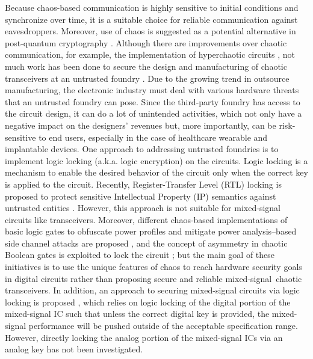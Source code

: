 Because chaos-based communication \cite{zhong1985experimental, hedayatipour2021comprehensive} is highly sensitive to initial conditions and synchronize over time, it is a suitable choice for reliable communication \cite{duan2022fully} against eavesdroppers. Moreover, use of chaos is suggested as a potential alternative in post-quantum cryptography \cite{onuki2022secret}. Although there are improvements over chaotic communication, for example, the implementation of hyperchaotic circuits \cite{zhang2022hyperchaotic}, not much work has been done to secure the design and manufacturing of chaotic transceivers at an untrusted foundry \cite{rezaei2019hybrid}. Due to the growing trend in outsource manufacturing, the electronic industry must deal with various hardware threats that an untrusted foundry can pose. Since the third-party foundry has access to the circuit design, it can do a lot of unintended activities, which not only have a negative impact on the designers' revenues but, more importantly, can be risk-sensitive to end users, especially in the case of healthcare wearable and implantable devices. One approach to addressing untrusted foundries is to implement logic locking (a.k.a. logic encryption) on the circuits. Logic locking \cite{Koushanfar-LL} is a mechanism to enable the desired behavior of the circuit only when the correct key is applied to the circuit. Recently, Register-Transfer Level (RTL) locking is proposed to protect sensitive Intellectual Property (IP) semantics against untrusted entities \cite{limaye2021fortifying}. However, this approach is not suitable for mixed-signal circuits like transceivers. Moreover, different chaos-based implementations of basic logic gates to obfuscate power profiles and mitigate power analysis–based side channel attacks are proposed \cite{8383903,8383903journal}, and the concept of asymmetry in chaotic Boolean gates is exploited to lock the circuit \cite{9424321}; but the main goal of these initiatives is to use the unique features of chaos to reach hardware security goals in digital circuits rather than proposing secure and reliable mixed-signal chaotic transceivers. In addition, an approach to securing mixed-signal circuits via logic locking is proposed \cite{8715043}, which relies on logic locking of the digital portion of the mixed-signal IC such that unless the correct digital key is provided, the mixed-signal performance will be pushed outside of the acceptable specification range. However, directly locking the analog portion of the mixed-signal ICs via an analog key has not been investigated.

